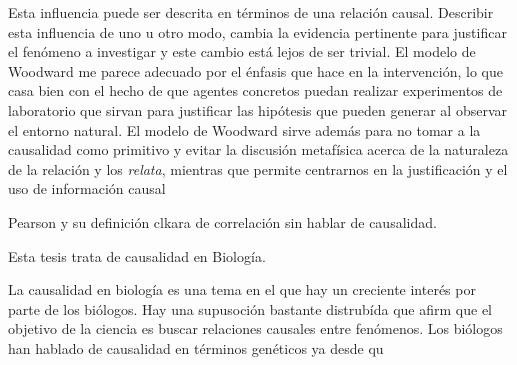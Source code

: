 Esta influencia puede ser descrita en términos de una relación causal. Describir esta influencia de uno u otro modo, cambia la evidencia pertinente para justificar el fenómeno a investigar y este cambio está lejos de ser trivial. El modelo de Woodward me parece adecuado por el énfasis que hace en la intervención, lo que casa bien con el hecho de que agentes concretos puedan realizar experimentos de laboratorio que sirvan para justificar las hipótesis que pueden generar al observar el entorno
natural. El modelo de Woodward sirve además para no tomar a la causalidad como primitivo y evitar la discusión metafísica acerca de la naturaleza de la relación y los \emph{relata}, mientras que permite
centrarnos en la justificación y el uso de información causal

Pearson y su definición clkara de correlación sin hablar de causalidad.

Esta tesis trata de causalidad en Biología.



La causalidad en biología es una tema en el que hay un creciente interés por parte de los biólogos. Hay una supusoción bastante distrubída que afirm que el objetivo de la ciencia es buscar relaciones causales entre fenómenos. Los biólogos han hablado de causalidad en términos genéticos ya desde qu




